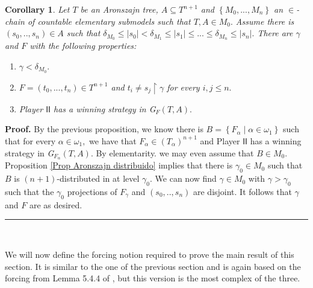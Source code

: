 \documentclass{article}
\newtheorem{corollary}[theorem]{Corollary}
\newenvironment{proof}[1][Proof]{\noindent\textbf{#1.} }{\ \rule{0.5em}{0.5em}}
\begin{document}
\begin{corollary}
Let $T$ be an Aronszajn tree, $A\subseteq T^{n+1}$ and $\left\{
M_{0},...,M_{n}\right\}  $ an $\in$-chain of countable elementary submodels
such that $T,A\in M_{0}.$ Assume there is $\left(  s_{0},..,s_{n}\right)  \in
A$ such that $\delta_{M_{0}}\leq\left\vert s_{0}\right\vert <\delta_{M_{1}%
}\leq\left\vert s_{1}\right\vert \leq...\leq\delta_{M_{n}}\leq\left\vert
s_{n}\right\vert .$ There are $\gamma$ and $F$ with the following properties:
\label{Corol del juego}

\begin{enumerate}
\item $\gamma<\delta_{M_{0}}.$

\item $F=\left(  t_{0},...,t_{n}\right)  \in T^{n+1}$ and $t_{i}\neq
s_{j}\upharpoonright\gamma$ for every $i,j\leq n.$

\item Player $\mathsf{II}$ has a winning strategy in \emph{G}$_{F}\left(
T,A\right)  .$
\end{enumerate}
\end{corollary}

\begin{proof}
By the previous proposition, we know there is $B=\left\{  F_{\alpha}\mid
\alpha\in\omega_{1}\right\}  $ such that for every $\alpha\in\omega_{1},$ we
have that $F_{\alpha}\in\left(  T_{\alpha}\right)  ^{n+1}$ and Player
$\mathsf{II}$ has a winning strategy in \emph{G}$_{F_{\alpha}}\left(
T,A\right)  .$ By elementarity. we may even assume that $B\in M_{0}.$
Proposition \ref{Prop Aronszajn distribuido} implies that there is $\gamma
_{0}\in M_{0}$ such that $B$ is $\left(  n+1\right)  $-distributed in at level
$\gamma_{0}.$ We can now find $\gamma\in M_{0}$ with $\gamma>\gamma_{0}$ such
that the $\gamma_{0}$ projections of $F_{\gamma}$ and $\left(  s_{0}%
,..,s_{n}\right)  $ are disjoint. It follows that $\gamma$ and $F$ are as desired.
\end{proof}

\qquad\ \ \qquad\ \ \ \ 

We will now define the forcing notion required to prove the main result of
this section. It is similar to the one of the previous section and is again
based on the forcing from Lemma 5.4.4 of \cite{Walks}, but this version is the
most complex of the three.
\end{document}
